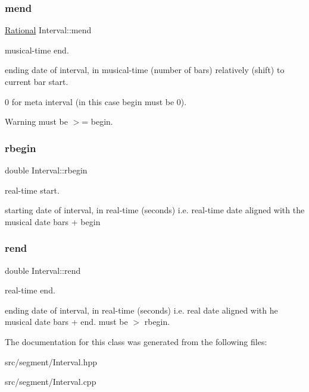 \subsubsection{\texorpdfstring{mend}{mend}}
{\footnotesize\ttfamily \mbox{\hyperlink{classRational}{Rational}} Interval\+::mend}



musical-\/time end. 

ending date of interval, in musical-\/time (number of bars) relatively (shift) to current bar start.

0 for meta interval (in this case begin must be 0).

\begin{DoxyWarning}{Warning}
must be $>$= begin. 
\end{DoxyWarning}
\mbox{\label{classInterval_aa17f339b42a23f6afc188971e7003d84}} 
\subsubsection{\texorpdfstring{rbegin}{rbegin}}
{\footnotesize\ttfamily double Interval\+::rbegin}



real-\/time start. 

starting date of interval, in real-\/time (seconds) i.\+e. real-\/time date aligned with the musical date bars + begin \mbox{\label{classInterval_a1acb3128311a318b23e68cc8ca0182e9}} 
\subsubsection{\texorpdfstring{rend}{rend}}
{\footnotesize\ttfamily double Interval\+::rend}



real-\/time end. 

ending date of interval, in real-\/time (seconds) i.\+e. real date aligned with he musical date bars + end. must be $>$ rbegin. 

The documentation for this class was generated from the following files\+:\begin{DoxyCompactItemize}
\item 
src/segment/Interval.\+hpp\item 
src/segment/Interval.\+cpp\end{DoxyCompactItemize}
